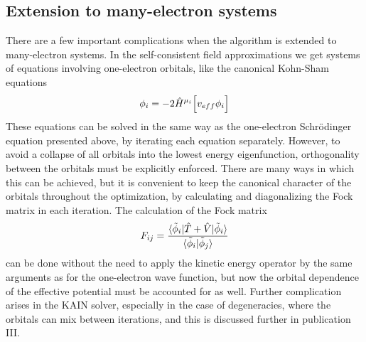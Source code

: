 \subsection{Extension to many-electron systems}
There are a few important complications when the algorithm is extended to many-electron systems.
In the self-consistent field approximations we get systems of equations involving one-electron 
orbitals, like the canonical Kohn-Sham equations
\begin{equation}
    \phi_i = -2 \hat{H}^{\mu_i}\Big[v_{eff}\phi_i\Big]
\end{equation}
These equations can be solved in the same way as the one-electron Schr\"{o}dinger equation presented 
above, by iterating each equation separately. However, to avoid a collapse of all orbitals into the
lowest energy eigenfunction, orthogonality between the orbitals must be explicitly enforced. There 
are many ways in which this can be achieved, but it is convenient to keep the canonical character of 
the orbitals throughout the optimization, by calculating and diagonalizing the Fock matrix in each 
iteration. The calculation of the Fock matrix 
\begin{equation}
    F_{ij} = \frac{\langle\tilde{\phi}_i|\hat{T}+\hat{V}|\tilde{\phi}_i\rangle}
	{\langle\tilde{\phi}_i|\tilde{\phi}_j\rangle}
\end{equation}
can be done without the need to apply the kinetic energy operator by the same arguments as for 
the one-electron wave function, but now the orbital dependence of the effective potential must
be accounted for as well. Further complication arises in the KAIN solver, especially in the case
of degeneracies, where the orbitals can mix between iterations, and this is discussed further in
publication III.

